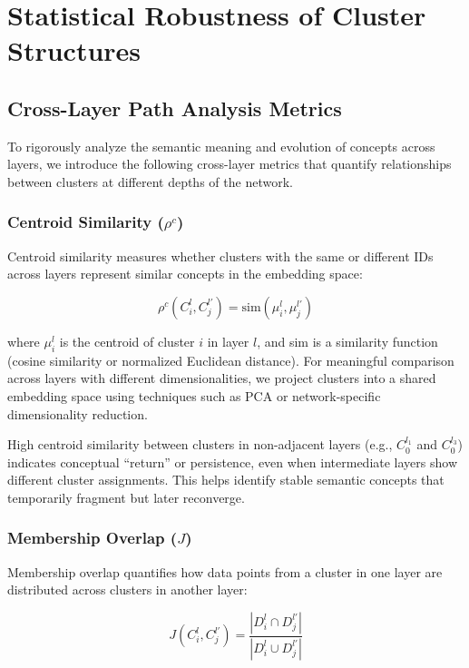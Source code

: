 \section{Statistical Robustness of Cluster Structures}

\subsection{Cross-Layer Path Analysis Metrics}

To rigorously analyze the semantic meaning and evolution of concepts across layers, we introduce the following cross-layer metrics that quantify relationships between clusters at different depths of the network.

\subsubsection{Centroid Similarity ($\rho^c$)}

Centroid similarity measures whether clusters with the same or different IDs across layers represent similar concepts in the embedding space:

\begin{equation}
\rho^c(C_i^l, C_j^{l'}) = \text{sim}(\mu_i^l, \mu_j^{l'})
\end{equation}

where $\mu_i^l$ is the centroid of cluster $i$ in layer $l$, and sim is a similarity function (cosine similarity or normalized Euclidean distance). For meaningful comparison across layers with different dimensionalities, we project clusters into a shared embedding space using techniques such as PCA or network-specific dimensionality reduction.

High centroid similarity between clusters in non-adjacent layers (e.g., $C_0^{l_1}$ and $C_0^{l_3}$) indicates conceptual ``return'' or persistence, even when intermediate layers show different cluster assignments. This helps identify stable semantic concepts that temporarily fragment but later reconverge.

\subsubsection{Membership Overlap ($J$)}

Membership overlap quantifies how data points from a cluster in one layer are distributed across clusters in another layer:

\begin{equation}
J(C_i^l, C_j^{l'}) = \frac{|D_i^l \cap D_j^{l'}|}{|D_i^l \cup D_j^{l'}|}
\end{equation}

